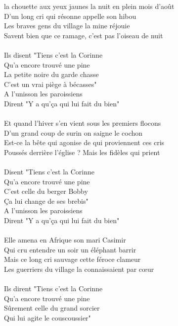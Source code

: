
 la chouette aux yeux jaunes la nuit en plein mois d'août
\\D'un long cri qui résonne appelle son hibou
\\Les braves gens du village la mine réjouie
\\Savent bien que ce ramage, c'est pas l'oiseau de nuit
\\\\Ils disent "Tiens c'est la Corinne
\\Qu'a encore trouvé une pine
\\La petite noire du garde chasse
\\C'est un vrai piège à bécasses"
\\A l'unisson les paroissiens
\\Dirent "Y a qu'ça qui lui fait du bien"
\\\\Et quand l'hiver s'en vient sous les premiers flocons
\\D'un grand coup de surin on saigne le cochon
\\Est-ce la bête qui agonise de qui proviennent ces cris
\\Poussés derrière l'église ? Mais les fidèles qui prient
\\\\Disent "Tiens c'est la Corinne
\\Qu'a encore trouvé une pine
\\C'est celle du berger Bobby
\\Ça lui change de ses brebis"
\\A l'unisson les paroissiens
\\Dirent "Y a qu'ça qui lui fait du bien"
\\\\Elle amena en Afrique son mari Casimir
\\Qui cru entendre un soir un éléphant barrir
\\Mais ce long cri sauvage cette féroce clameur
\\Les guerriers du village la connaissaient par cœur
\\\\Ils dirent "Tiens c'est la Corinne
\\Qu'a encore trouvé une pine
\\Sûrement celle du grand sorcier
\\Qui lui agite le couscoussier"
